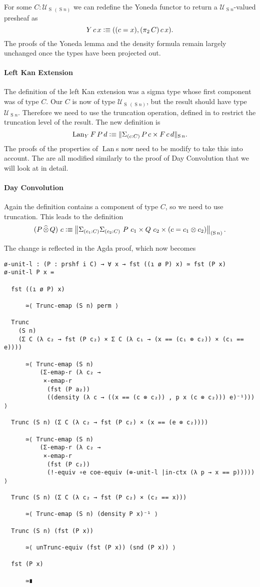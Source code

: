 \documentclass[12pt, parskip, DIV=14]{scrbook}
\newcommand{\defeq}{\vcentcolon\equiv}
\newcommand{\Suc}{\operatorname{S}}
\DeclareMathOperator\daytensor{\widehat\otimes}
\newcommand{\Lan}{\operatorname{Lan}}
\begin{document}
For some $C : \mathcal{U}_{\Suc\,(\Suc n)}$ we can redefine the Yoneda functor to return a $\mathcal{U}_{\Suc n}$-valued presheaf as
$$Y\,c\,x \defeq ((c = x) , (\pi_2\,C)\,c\,x).$$ The proofs of the Yoneda lemma and the density formula remain largely unchanged once the types have been projected out.

\paragraph{Left Kan Extension}

The definition of the left Kan extension was a sigma type whose first component was of type $C$. Our $C$ is now of type $\mathcal{U}_{\Suc\,(\Suc n)}$, but the result should have type $\mathcal{U}_{\Suc n}$. Therefore we need to use the truncation operation, defined in  to restrict the truncation level of the result. The new definition is
$$\Lan_Y F\,P\,d \defeq \| \Sigma_{(c : C)}\,P\,c \times F\,c\,d \|_{\Suc n}.$$
The proofs of the properties of $\Lan$s now need to be modify to take this into account. The are all modified similarly to the proof of Day Convolution that we will look at in detail.

\paragraph{Day Convolution}

Again the definition contains a component of type $C$, so we need to use truncation. This leads to the definition
$$(P \daytensor Q)~c \defeq \left\| \Sigma_{(c_1 : C)}\Sigma_{(c_2 : C)}~P~c_1 \times Q~c_2 \times (c = c_1 \otimes c_2)\right\|_{(\Suc n)}.$$

The change is reflected in the Agda proof, which now becomes
{\small
\begin{verbatim}
ø-unit-l : (P : prshf i C) → ∀ x → fst ((ı ø P) x) ≃ fst (P x)
ø-unit-l P x =

  fst ((ı ø P) x)

      ≃⟨ Trunc-emap (S n) perm ⟩

  Trunc
    (S n)
    (Σ C (λ c₂ → fst (P c₂) × Σ C (λ c₁ → (x == (c₁ ⊗ c₂)) × (c₁ == e))))

      ≃⟨ Trunc-emap (S n)
          (Σ-emap-r (λ c₂ →
           ×-emap-r
            (fst (P a₂))
            ((density (λ c → ((x == (c ⊗ c₂)) , p x (c ⊗ c₂))) e)⁻¹))) ⟩

  Trunc (S n) (Σ C (λ c₂ → fst (P c₂) × (x == (e ⊗ c₂))))

      ≃⟨ Trunc-emap (S n)
          (Σ-emap-r (λ c₂ →
           ×-emap-r
            (fst (P c₂))
            (!-equiv ∘e coe-equiv (⊗-unit-l |in-ctx (λ p → x == p))))) ⟩

  Trunc (S n) (Σ C (λ c₂ → fst (P c₂) × (c₂ == x)))

      ≃⟨ Trunc-emap (S n) (density P x)⁻¹ ⟩

  Trunc (S n) (fst (P x))

      ≃⟨ unTrunc-equiv (fst (P x)) (snd (P x)) ⟩

  fst (P x)

      ≃∎
\end{verbatim}}
\end{document}
